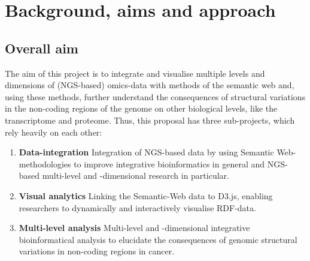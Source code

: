 \documentclass[twoside,fontsize=10pt]{article}
\begin{document}
\section*{Background, aims and approach}
\subsection*{Overall aim}
The aim of this project is to integrate and visualise multiple levels and dimensions of (NGS-based) omics-data with methods of the semantic web and, using these methods, further understand the consequences of structural variations in the non-coding regions of the genome on other biological levels, like the transcriptome and proteome. Thus, this proposal has three sub-projects, which rely heavily on each other:

\begin{enumerate}
\item \textbf{Data-integration} 
Integration of NGS-based data by using Semantic Web-methodologies to improve integrative bioinformatics in general and NGS-based multi-level and -dimensional research in particular.
\item \textbf{Visual analytics} 
Linking the Semantic-Web data to D3.js, enabling researchers to dynamically and interactively visualise RDF-data.
\item \textbf{Multi-level analysis} 
Multi-level and -dimensional integrative bioinformatical analysis to elucidate the consequences of genomic structural variations in non-coding regions in cancer.
\end{enumerate}
\end{document}

